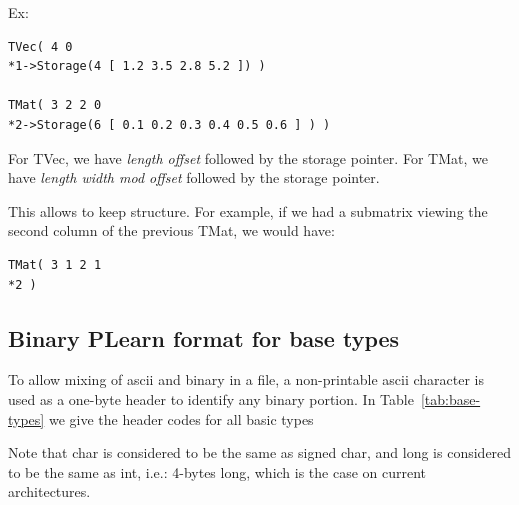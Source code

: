 \documentclass[11pt]{book}
\begin{document}
Ex:

\begin{verbatim}
TVec( 4 0 
*1->Storage(4 [ 1.2 3.5 2.8 5.2 ]) )

TMat( 3 2 2 0 
*2->Storage(6 [ 0.1 0.2 0.3 0.4 0.5 0.6 ] ) )
\end{verbatim}

For TVec, we have {\em length offset} followed by the storage pointer.
For TMat, we have {\em length width mod offset} followed by the storage pointer.

This allows to keep structure. For example, if we had a submatrix viewing
the second column of the previous TMat, we would have:

\begin{verbatim}
TMat( 3 1 2 1
*2 )
\end{verbatim}

\subsection{Binary PLearn format for base types}

To allow mixing of ascii and binary in a file, a non-printable ascii
character is used as a one-byte header to identify any binary portion.  In
Table~\ref{tab:base-types} we give the header codes for all basic types

Note that char is considered to be the same as signed char, and long is
considered to be the same as int, i.e.: 4-bytes long, which is the case on
current architectures.
\end{document}

